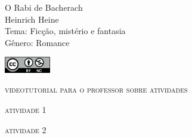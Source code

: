\documentclass[smaller,professionalfonts,15pt]{beamer}
\begin{document}
										\begin{frame}\begin{raggedleft}
										\Huge 
O Rabi de Bacherach						\\
										\huge 
Heinrich Heine							\\
										\bigskip
										\normalsize
Tema: Ficção, mistério e fantasia		\\	
Gênero: Romance							\\\vfill\hfill
\publishername

										\end{raggedleft}

\smallskip\includegraphics[width=2cm]{ccbync.png}\hfill
\end{frame}


\begin{frame}{\textsc{videotutorial para o professor sobre atividades}}
\vspace{-2cm}\begin{figure}
\end{figure}
\end{frame}


\begin{frame}
\hfill\Huge
\textsc{atividade 1}
\end{frame}


\begin{frame}
\hfill\Huge
\textsc{atividade 2}
\end{frame}
\end{document}
